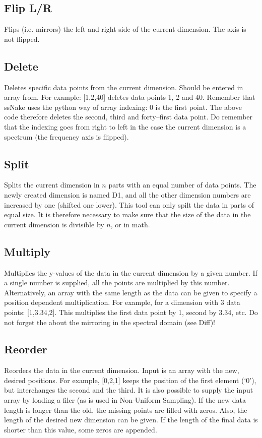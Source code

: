 \documentclass[11pt,a4paper]{article}
\begin{document}
\subsection{Flip L/R}
Flips (i.e. mirrors) the left and right side of the current dimension. The axis is not flipped.

\subsection{Delete}
Deletes specific data points from the current dimension. Should be entered in array from. For example: [1,2,40] deletes data points 1, 2 and 40. Remember that ssNake uses the python way of array indexing: 0 is the first point. The above code therefore deletes the second, third and forty--first data point. Do remember that the indexing goes from right to left in the case the current dimension is a spectrum (the frequency axis is flipped).

\subsection{Split}
Splits the current dimension in $n$ parts with an equal number of data points. The newly created dimension is named D1, and all the other dimension numbers are increased by one (shifted one lower). This tool can only spilt the data in parts of equal size. It is therefore necessary to make sure that the size of the data in the current dimension is divisible by $n$, or in math.

\subsection{Multiply}
Multiplies the y-values of the data in the current dimension by a given number. If a single number is supplied, all the points are multiplied by this number. Alternatively, an array with the same length as the data can be given to specify a position dependent multiplication. For example, for a dimension with 3 data points: [1,3.34,2]. This multiplies the first data point by 1, second by 3.34, etc. Do not forget the about the mirroring in the spectral domain (see Diff)!

\subsection{Reorder}
Reorders the data in the current dimension. Input is an array with the new, desired positions. For example, [0,2,1] keeps the position of the first element (`0'), but interchanges the second and the third. It is also possible to supply the input array by loading a filer (as is used in Non-Uniform Sampling). If the new data length is longer than the old, the missing points are filled with zeros. Also, the length of the desired new dimension can be given. If the length of the final data is shorter than this value, some zeros are appended.
\end{document}
